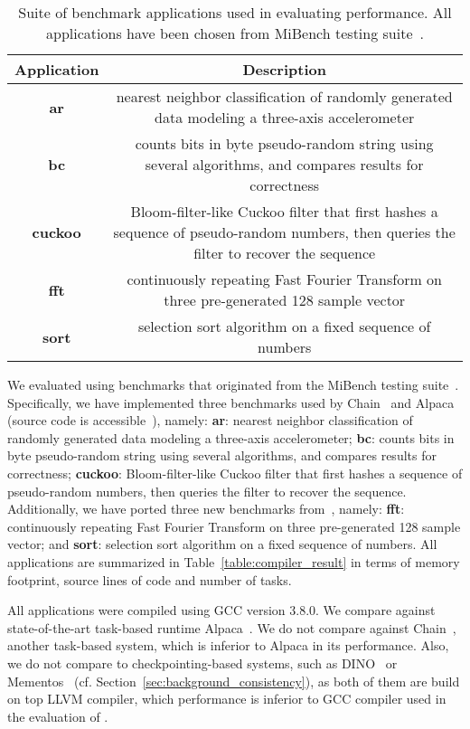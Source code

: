 \begin{table}
	\centering
	\footnotesize
	\begin{tabular}{| c | c |}
		\hline
		Application & Description \\
		\hline\hline
		\textbf{ar} & nearest neighbor classification of randomly generated data modeling a three-axis accelerometer\\
		\textbf{bc} & counts bits in byte pseudo-random string using several algorithms, and compares results for correctness\\
		\textbf{cuckoo} & Bloom-filter-like Cuckoo filter that first hashes a sequence of pseudo-random numbers, then queries the filter to recover the sequence\\
		\textbf{fft} & continuously repeating Fast Fourier Transform on three pre-generated 128 sample vector\\
		\textbf{sort} & selection sort algorithm on a fixed sequence of numbers\\
		\hline
	\end{tabular}
\caption{Suite of benchmark applications used in evaluating \sys performance. All applications have been chosen from MiBench testing suite~\cite{mibench,hicks_mibench2_2016}.}
\label{table:benchmark_table}
\end{table}

We evaluated \sys using benchmarks that originated from the MiBench testing suite~\cite{mibench,hicks_mibench2_2016}. Specifically, we have implemented three benchmarks used by Chain~\cite{chain} and Alpaca~\cite{alpaca} (source code is accessible~\cite{coala_website}), namely: \textbf{ar}: nearest neighbor classification of randomly generated data modeling a three-axis accelerometer; \textbf{bc}: counts bits in byte pseudo-random string using several algorithms, and compares results for correctness; \textbf{cuckoo}: Bloom-filter-like Cuckoo filter that first hashes a sequence of pseudo-random numbers, then queries the filter to recover the sequence. Additionally, we have ported three new benchmarks from~\cite{mibench}, namely: \textbf{fft}: continuously repeating Fast Fourier Transform on three pre-generated 128 sample vector; and \textbf{sort}: selection sort algorithm on a fixed sequence of numbers.  All applications are summarized in Table~\ref{table:compiler_result} in terms of memory footprint, source lines of code and number of tasks. 

All applications were compiled using GCC version 3.8.0.  We compare \sys against state-of-the-art task-based runtime Alpaca~\cite{alpaca}. We do not compare \sys against Chain~\cite{chain}, another task-based system, which is inferior to Alpaca in its performance. Also, we do not compare \sys to checkpointing-based systems, such as DINO~\cite{dino} or Mementos~\cite{mementos} (cf. Section~\ref{sec:background_consistency}), as both of them are build on top LLVM compiler, which performance is inferior to GCC compiler used in the evaluation of \sys {}.